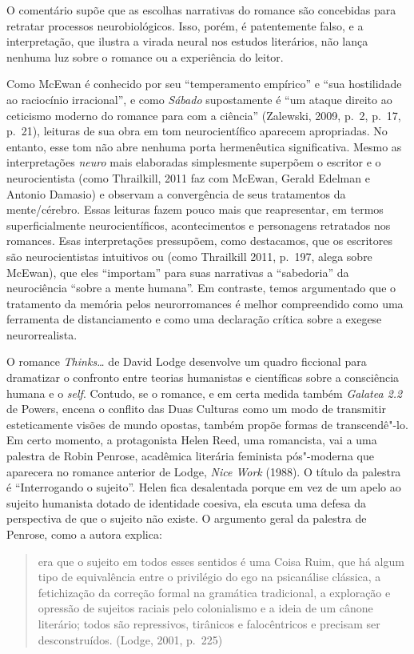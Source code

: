 O comentário supõe que as escolhas narrativas do romance são concebidas
para retratar processos neurobiológicos. Isso, porém, é patentemente
falso, e a interpretação, que ilustra a virada neural nos estudos
literários, não lança nenhuma luz sobre o romance ou a experiência do
leitor.

Como McEwan é conhecido por seu ``temperamento empírico'' e ``sua
hostilidade ao raciocínio irracional'', e como \emph{Sábado}
supostamente é ``um ataque direito ao ceticismo moderno do romance para
com a ciência'' (Zalewski, 2009, p.~2, p.~17, p.~21), leituras de sua obra
em tom neurocientífico aparecem apropriadas. No entanto, esse tom não
abre nenhuma porta hermenêutica significativa. Mesmo as interpretações
\emph{neuro} mais elaboradas simplesmente superpõem o escritor e o
neurocientista (como Thrailkill, 2011 faz com McEwan, Gerald Edelman e
Antonio Damasio) e observam a convergência de seus tratamentos da
mente/cérebro. Essas leituras fazem pouco mais que reapresentar, em
termos superficialmente neurocientíficos, acontecimentos e personagens
retratados nos romances. Esas interpretações pressupõem, como
destacamos, que os escritores são neurocientistas intuitivos ou (como
Thrailkill 2011, p.~197, alega sobre McEwan), que eles ``importam'' para
suas narrativas a ``sabedoria'' da neurociência ``sobre a mente
humana''. Em contraste, temos argumentado que o tratamento da memória
pelos neurorromances é melhor compreendido como uma ferramenta de
distanciamento e como uma declaração crítica sobre a exegese
neurorrealista.

O romance \emph{Thinks\ldots{}} de David Lodge desenvolve um quadro ficcional
para dramatizar o confronto entre teorias humanistas e científicas sobre
a consciência humana e o \emph{self}. Contudo, se o romance, e em certa medida
também \emph{Galatea 2.2} de Powers, encena o conflito das Duas Culturas
como um modo de transmitir esteticamente visões de mundo opostas, também
propõe formas de transcendê"-lo. Em certo momento, a protagonista Helen
Reed, uma romancista, vai a uma palestra de Robin Penrose, acadêmica
literária feminista pós"-moderna que aparecera no romance anterior de
Lodge, \emph{Nice Work} (1988). O título da palestra é ``Interrogando o
sujeito''. Helen fica desalentada porque em vez de um apelo ao sujeito
humanista dotado de identidade coesiva, ela escuta uma defesa da
perspectiva de que o sujeito não existe. O argumento geral da palestra
de Penrose, como a autora explica:

\begin{quote}
era que o sujeito em todos esses sentidos é uma Coisa Ruim, que há algum
tipo de equivalência entre o privilégio do ego na psicanálise clássica,
a fetichização da correção formal na gramática tradicional, a exploração
e opressão de sujeitos raciais pelo colonialismo e a ideia de um cânone
literário; todos são repressivos, tirânicos e falocêntricos e precisam
ser desconstruídos. (Lodge, 2001, p.~225)
\end{quote}

